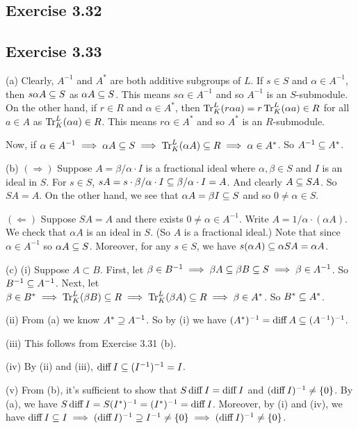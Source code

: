 \documentclass[../Marcus.tex]{subfiles}
\begin{document}
\subsection*{Exercise 3.32}

\subsection*{Exercise 3.33}

(a) Clearly, $A^{-1}$ and $A^*$ are both additive subgroups of $L$. If $s\in S$ and $\alpha\in A^{-1}$, then $s\alpha A\subseteq S$ as $\alpha A \subseteq S$. This means $s\alpha \in A^{-1}$ and so $A^{-1}$ is an $S$-submodule. On the other hand, if $r\in R$ and $\alpha\in A^*$, then $\operatorname{Tr}^L_K (r\alpha a) = r \operatorname{Tr}^L_K(\alpha a) \in R$ for all $a\in A$ as $\operatorname{Tr}^L_K(\alpha a) \in R$. This means $r\alpha \in A^*$ and so $A^*$ is an $R$-submodule.

Now, if $\alpha\in A^{-1} \implies \alpha A\subseteq S \implies \operatorname{Tr}^L_K(\alpha A) \subseteq R \implies \alpha \in A^*$. So $A^{-1} \subseteq A^*$.

(b) $(\Rightarrow)$ Suppose $A=\beta/\alpha \cdot I$ is a fractional ideal where $\alpha,\beta \in S$ and $I$ is an ideal in $S$. For $s\in S$, $sA = s \cdot \beta/\alpha \cdot I \subseteq \beta/\alpha \cdot I = A$. And clearly $A \subseteq SA$. So $SA=A$. On the other hand, we see that $\alpha A = \beta I \subseteq S$ and so $0\neq\alpha\in S$.

$(\Leftarrow)$ Suppose $SA=A$ and there exists $0\neq \alpha \in A^{-1}$. Write $A = 1/\alpha \cdot (\alpha A)$. We check that $\alpha A$ is an ideal in $S$. (So $A$ is a fractional ideal.) Note that since $\alpha \in A^{-1}$ so $\alpha A \subseteq S$. Moreover, for any $s\in S$, we have $s(\alpha A) \subseteq \alpha SA = \alpha A$.

(c) (i) Suppose $A\subset B$. First, let $\beta \in B^{-1} \implies \beta A \subseteq \beta B \subseteq S \implies \beta \in A^{-1}$. So $B^{-1} \subseteq A^{-1}$. Next, let $\beta \in B^* \implies \operatorname{Tr}^L_K(\beta B) \subseteq R \implies \operatorname{Tr}^L_K(\beta A) \subseteq R \implies \beta \in A^*$. So $B^* \subseteq A^*$.

(ii) From (a) we know $A^* \supseteq A^{-1}$. So by (i) we have $(A^*)^{-1} = \operatorname{diff} A \subseteq (A^{-1})^{-1}$.

(iii) This follows from Exercise 3.31 (b).

(iv) By (ii) and (iii), $\operatorname{diff} I \subseteq (I^{-1})^{-1} = I$.

(v) From (b), it's sufficient to show that $S\operatorname{diff} I = \operatorname{diff} I$ and $(\operatorname{diff} I)^{-1} \neq \{0\}$. By (a), we have $S \operatorname{diff} I = S (I^*)^{-1} = (I^*)^{-1} = \operatorname{diff} I$. Moreover, by (i) and (iv), we have $\operatorname{diff} I \subseteq I \implies (\operatorname{diff} I)^{-1} \supseteq I^{-1} \neq \{0\} \implies (\operatorname{diff} I)^{-1} \neq \{0\}$.
\end{document}
